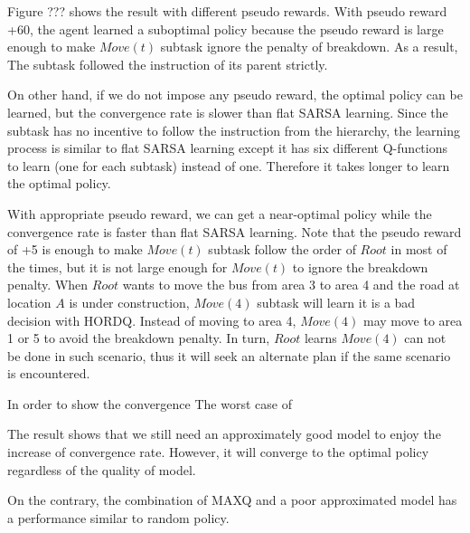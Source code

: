 \documentclass{article} %
\begin{document}
Figure ??? shows the result with different pseudo rewards. 
With pseudo reward +60, the agent learned a suboptimal policy because
the pseudo reward is large enough to make $Move(t)$ subtask ignore 
the penalty of breakdown. As a result, The subtask followed 
the instruction of its parent strictly.

On other hand, if we do not impose any pseudo reward, 
the optimal policy can be learned, but the convergence rate is
slower than flat SARSA learning. Since the subtask has no
incentive to follow the instruction from the hierarchy, 
the learning process is similar to flat SARSA learning 
except it has six different Q-functions to learn (one for each subtask) instead of one.
Therefore it takes longer to learn the optimal policy. 

With appropriate pseudo reward, we can get a near-optimal policy
while the convergence rate is faster than flat SARSA learning.
Note that the pseudo reward of +5 is enough to make $Move(t)$ subtask follow 
the order of $Root$ in most of the times, but it is not large enough for $Move(t)$ to ignore
the breakdown penalty. When $Root$ wants to move the bus from area 
3 to area 4 and the road at location $A$ is under construction, $Move(4)$ subtask
will learn it is a bad decision with HORDQ.
Instead of moving to area 4, $Move(4)$ may move to area 1 or 5 to avoid
the breakdown penalty. In turn, $Root$ learns $Move(4)$ can not be done in 
such scenario, thus it will seek an alternate plan if the same scenario
is encountered.

In order to show the convergence 
The worst case of 

The result shows that we still need an approximately good model 
to enjoy the increase of convergence rate. However, 
it will converge to the optimal policy regardless of the quality of model.

On the contrary, the combination of MAXQ and a poor approximated model has
a performance similar to random policy.









{\small


}
\end{document}
